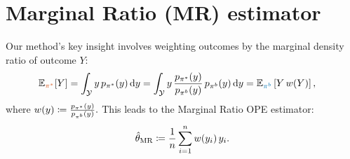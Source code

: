 
\section{Marginal Ratio (MR) estimator}
 
Our method's key insight involves weighting outcomes by the marginal density ratio of outcome $Y$:
\begin{align*}
\Etarred[Y] &= \int_{\Yspace} y \, \ptar(y)\, \mathrm{d}y = \int_\Yspace y\, \frac{\ptar(y)}{\pbeh(y)} \, \pbeh(y) \, \mathrm{d}y = \Ebehblue\left[Y\, w(Y) \right],
\end{align*}
where 
$
w(y) \coloneqq \frac{p_{\pi^*}(y)}{p_{\pi^b}(y)}.
$
This leads to the Marginal Ratio OPE estimator:
\begin{align*}
    \hat{\theta}_{\textup{MR}} \coloneqq \frac{1}{n}\sum_{i=1}^n w(y_i) \, y_i.
\end{align*}

